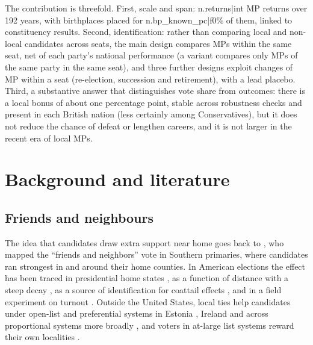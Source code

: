 \documentclass[11pt,a4paper]{article}
\begin{document}
The contribution is threefold. First, scale and span: {{n.returns|int}} MP returns over 192 years, with birthplaces placed for {{n.bp_known_pc|f0}}\% of them, linked to constituency results. Second, identification: rather than comparing local and non-local candidates across seats, the main design compares MPs within the same seat, net of each party's national performance (a variant compares only MPs of the same party in the same seat), and three further designs exploit changes of MP within a seat (re-election, succession and retirement), with a lead placebo. Third, a substantive answer that distinguishes vote share from outcomes: there is a local bonus of about one percentage point, stable across robustness checks and present in each British nation (less certainly among Conservatives), but it does not reduce the chance of defeat or lengthen careers, and it is not larger in the recent era of local MPs.

\section{Background and literature}
\subsection{Friends and neighbours}
The idea that candidates draw extra support near home goes back to \citet{key1949}, who mapped the ``friends and neighbors'' vote in Southern primaries, where candidates ran strongest in and around their home counties. In American elections the effect has been traced in presidential home states \citep{lewisbeckrice1983}, as a function of distance with a steep decay \citep{gimpel2008}, as a source of identification for coattail effects \citep{meredith2013}, and in a field experiment on turnout \citep{panagopoulos2017}. Outside the United States, local ties help candidates under open-list and preferential systems in Estonia \citep{tavits2010}, Ireland \citep{goreckimarsh2012} and across proportional systems more broadly \citep{shugart2005}, and voters in at-large list systems reward their own localities \citep{fivahalse2016}.
\end{document}
